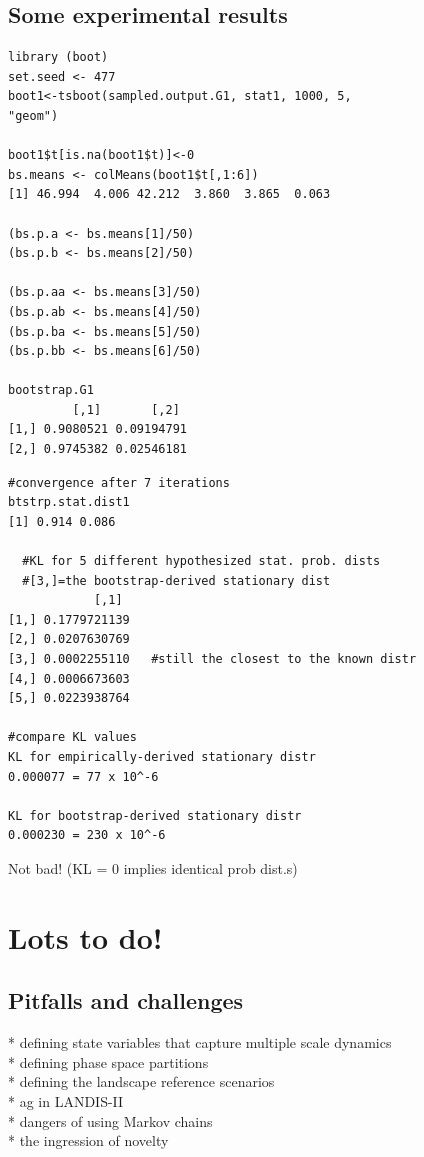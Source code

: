 \documentclass[
paper=128mm:96mm, %
fontsize=11pt, %
pagesize, %
parskip=half-, %
]{scrartcl} %
\theoremstyle{mythmstyle} %
\begin{document}
\subsection{Some experimental results}
\tiny 
\begin{multicols}{2}
\begin{verbatim}
library (boot)
set.seed <- 477
boot1<-tsboot(sampled.output.G1, stat1, 1000, 5, 
"geom")

boot1$t[is.na(boot1$t)]<-0
bs.means <- colMeans(boot1$t[,1:6])
[1] 46.994  4.006 42.212  3.860  3.865  0.063

(bs.p.a <- bs.means[1]/50)
(bs.p.b <- bs.means[2]/50)

(bs.p.aa <- bs.means[3]/50)
(bs.p.ab <- bs.means[4]/50)
(bs.p.ba <- bs.means[5]/50)
(bs.p.bb <- bs.means[6]/50)

bootstrap.G1
         [,1]       [,2]
[1,] 0.9080521 0.09194791
[2,] 0.9745382 0.02546181
\end{verbatim}
\vfill
\columnbreak
\begin{verbatim}
#convergence after 7 iterations
btstrp.stat.dist1
[1] 0.914 0.086

  #KL for 5 different hypothesized stat. prob. dists
  #[3,]=the bootstrap-derived stationary dist
            [,1]
[1,] 0.1779721139
[2,] 0.0207630769
[3,] 0.0002255110	#still the closest to the known distr
[4,] 0.0006673603
[5,] 0.0223938764

#compare KL values
KL for empirically-derived stationary distr
0.000077 = 77 x 10^-6 

KL for bootstrap-derived stationary distr
0.000230 = 230 x 10^-6
\end{verbatim}
Not bad! (KL = 0 implies identical prob dist.s)
\end{multicols}

\clearpage
\section{Lots to do!}
\subsection{Pitfalls and challenges}
\small
\begin{flushleft}
* defining state variables that capture multiple scale dynamics\\
* defining phase space partitions\\
* defining the landscape reference scenarios\\
* ag in LANDIS-II\\
* dangers of using Markov chains \\
* the ingression of novelty
\end{flushleft}
\end{document}
